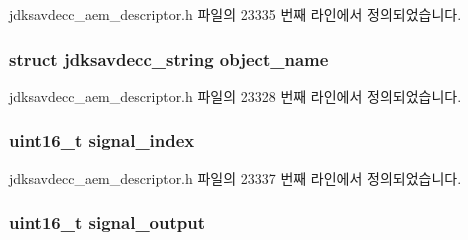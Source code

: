 jdksavdecc\+\_\+aem\+\_\+descriptor.\+h 파일의 23335 번째 라인에서 정의되었습니다.

\subsubsection[{\texorpdfstring{object\+\_\+name}{object_name}}]{\setlength{\rightskip}{0pt plus 5cm}struct {\bf jdksavdecc\+\_\+string} object\+\_\+name}\hypertarget{structjdksavdecc__descriptor__signal__transcoder_a7d1f5945a13863b1762fc6db74fa8f80}{}\label{structjdksavdecc__descriptor__signal__transcoder_a7d1f5945a13863b1762fc6db74fa8f80}


jdksavdecc\+\_\+aem\+\_\+descriptor.\+h 파일의 23328 번째 라인에서 정의되었습니다.

\subsubsection[{\texorpdfstring{signal\+\_\+index}{signal_index}}]{\setlength{\rightskip}{0pt plus 5cm}uint16\+\_\+t signal\+\_\+index}\hypertarget{structjdksavdecc__descriptor__signal__transcoder_ae2e81a95ee9ad83f1fe22b6a1ee29075}{}\label{structjdksavdecc__descriptor__signal__transcoder_ae2e81a95ee9ad83f1fe22b6a1ee29075}


jdksavdecc\+\_\+aem\+\_\+descriptor.\+h 파일의 23337 번째 라인에서 정의되었습니다.

\subsubsection[{\texorpdfstring{signal\+\_\+output}{signal_output}}]{\setlength{\rightskip}{0pt plus 5cm}uint16\+\_\+t signal\+\_\+output}\hypertarget{structjdksavdecc__descriptor__signal__transcoder_ab4b91864e6fc335d7e86536d9f4461e4}{}\label{structjdksavdecc__descriptor__signal__transcoder_ab4b91864e6fc335d7e86536d9f4461e4}


